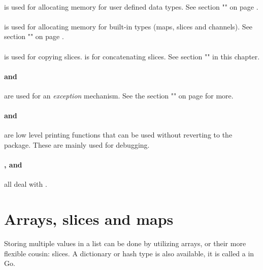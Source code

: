 \paragraph{} is used for allocating memory for user defined
data types. See section "" on page
\pageref{sec:allocation with new}.

\paragraph{} is used for allocating memory for built-in
types (maps, slices and channels). See section 
"" on page
\pageref{sec:allocation with make}.

\paragraph{} is used for copying slices.  is 
for concatenating slices. See section "" in this
chapter.

\paragraph{ and } are used for an 
\emph{exception} mechanism. See the section "" on 
page \pageref{sec:panic} for more.

\paragraph{ and } are low level printing
functions that can be used without reverting to the
package. These are mainly used for debugging.

\paragraph{,  and } all deal with
. 


\section{Arrays, slices and maps}
\label{sec:arrays}
Storing multiple values in a list can be done by utilizing arrays, or
their more flexible cousin: slices. A dictionary or hash type is also
available, it is called a  in Go.

